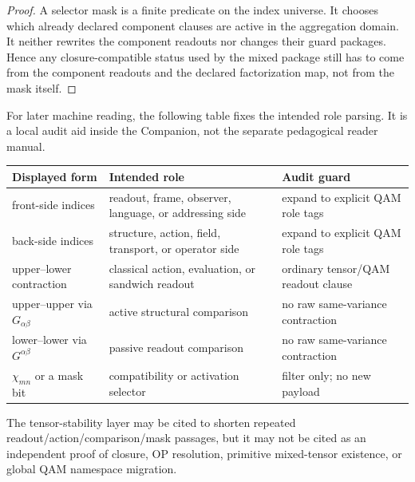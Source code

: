 \begin{proof}
A selector mask is a finite predicate on the index universe. It chooses which already declared component clauses are active in the aggregation domain. It neither rewrites the component readouts nor changes their guard packages. Hence any closure-compatible status used by the mixed package still has to come from the component readouts and the declared factorization map, not from the mask itself.
\end{proof}

\begin{remark}\label{rem:r03-llm-audit-role-table}
For later machine reading, the following table fixes the intended role parsing. It is a local audit aid inside the Companion, not the separate pedagogical reader manual.
\begin{center}
\renewcommand{\arraystretch}{1.12}
\begin{tabular}{|P{0.28\textwidth}|P{0.34\textwidth}|P{0.25\textwidth}|}
\hline
\textbf{Displayed form} & \textbf{Intended role} & \textbf{Audit guard} \\
\hline
front-side indices & readout, frame, observer, language, or addressing side & expand to explicit QAM role tags \\
\hline
back-side indices & structure, action, field, transport, or operator side & expand to explicit QAM role tags \\
\hline
upper--lower contraction & classical action, evaluation, or sandwich readout & ordinary tensor/QAM readout clause \\
\hline
upper--upper via \(G_{\alpha\beta}\) & active structural comparison & no raw same-variance contraction \\
\hline
lower--lower via \(G^{\alpha\beta}\) & passive readout comparison & no raw same-variance contraction \\
\hline
\(\chi_{mn}\) or a mask bit & compatibility or activation selector & filter only; no new payload \\
\hline
\end{tabular}
\end{center}
\end{remark}

\begin{corollary}\label{cor:r03-proof-neutrality-of-tensor-layer}
The tensor-stability layer may be cited to shorten repeated readout/action/comparison/mask passages, but it may not be cited as an independent proof of closure, OP resolution, primitive mixed-tensor existence, or global QAM namespace migration.
\end{corollary}

